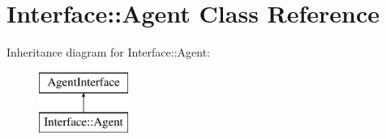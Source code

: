 \hypertarget{class_interface_1_1_agent}{\section{Interface\-:\-:Agent Class Reference}
\label{class_interface_1_1_agent}
}
Inheritance diagram for Interface\-:\-:Agent\-:\begin{figure}[H]
\begin{center}
\leavevmode
\includegraphics[height=2.000000cm]{class_interface_1_1_agent}
\end{center}
\end{figure}

